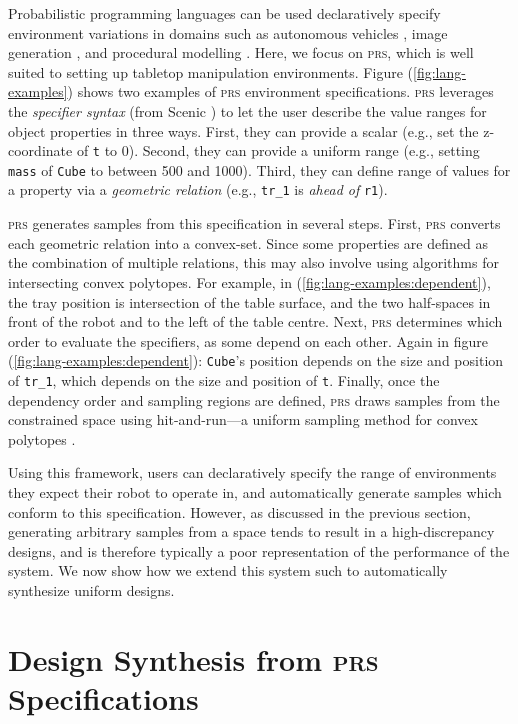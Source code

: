 \documentclass[sigplan, screen]{acmart} %
\begin{document}
Probabilistic programming languages can be used declaratively specify environment variations in domains such as autonomous vehicles \cite{fremont2018scenic}, image generation \cite{kulkarni2015picture}, and procedural modelling \cite{ritchiequicksand}. Here, we focus on \textsc{prs}, which is well suited to setting up tabletop manipulation environments. Figure (\ref{fig:lang-examples}) shows two examples of \textsc{prs} environment specifications. \textsc{prs} leverages the \emph{specifier syntax} (from Scenic \cite{fremont2018scenic}) to let the user describe the value ranges for object properties in three ways. First, they can provide a scalar (e.g., set the z-coordinate of \texttt{t} to 0). Second, they can provide a uniform range (e.g., setting \texttt{mass} of \texttt{Cube} to between 500 and 1000). Third, they can define range of values for a property via a \emph{geometric relation} (e.g., \texttt{tr\_1} is \emph{ahead of} \texttt{r1}). 

\textsc{prs} generates samples from this specification in several steps. First, \textsc{prs} converts each geometric relation into a convex-set. Since some properties are defined as the combination of multiple relations, this may also involve using algorithms for intersecting convex polytopes. For example, in (\ref{fig:lang-examples:dependent}), the tray position is intersection of the table surface, and the two half-spaces in front of the robot and to the left of the table centre. Next, \textsc{prs} determines which order to evaluate the specifiers, as some depend on each other. Again in figure (\ref{fig:lang-examples:dependent}): \texttt{Cube}'s position depends on the size and position of \texttt{tr\_1}, which depends on the size and position of \texttt{t}. Finally, once the dependency order and sampling regions are defined, \textsc{prs} draws samples from the constrained space using hit-and-run---a uniform sampling method for convex polytopes \cite{Zabinsky2013}.

Using this framework, users can declaratively specify the range of environments they expect their robot to operate in, and automatically generate samples which conform to this specification. However, as discussed in the previous section, generating arbitrary samples from a space tends to result in a high-discrepancy designs, and is therefore typically a poor representation of the performance of the system. We now show how we extend this system such to automatically synthesize uniform designs.

\section{Design Synthesis from \textsc{prs} Specifications}
\end{document}
